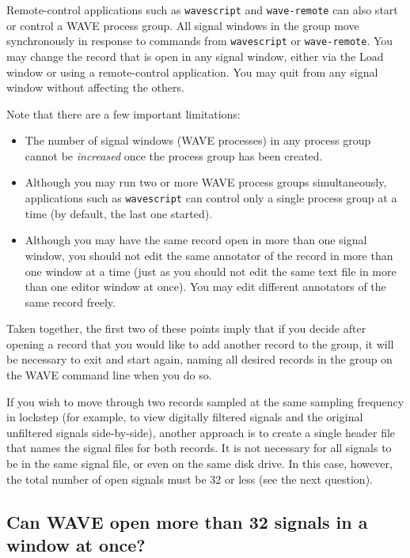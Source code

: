 \documentclass[twoside]{book}
\newcommand{\WAVE}{{\sf WAVE}\xspace}
\begin{document}
Remote-control applications such as {\tt wavescript} and {\tt wave-remote} can
also start or control a \WAVE{} process group.  All signal windows in the
group move synchronously in response to commands from {\tt wavescript} or
{\tt wave-remote}.  You may change the record that is open in any signal
window, either via the {\sf Load} window or using a remote-control application.
You may quit from any signal window without affecting the others.

Note that there are a few important limitations:
\begin{itemize}
\item
The number of signal windows (\WAVE{} processes) in any process group cannot
be \emph{increased} once the process group has been created.  

\item
Although you may run two or more \WAVE{} process groups simultaneously,
applications such as {\tt wavescript} can control only a single process group
at a time (by default, the last one started).

\item
Although you may have the same record open in more than one signal window, you
should not edit the same annotator of the record in more than one window at a
time (just as you should not edit the same text file in more than one editor
window at once).  You may edit different annotators of the same record
freely.
\end{itemize}

Taken together, the first two of these points imply that if you decide after
opening a record that you would like to add another record to the group, it
will be necessary to exit and start again, naming all desired records in the
group on the \WAVE{} command line when you do so.

If you wish to move through two records sampled at the same sampling
frequency in lockstep (for example, to view digitally filtered signals
and the original unfiltered signals side-by-side), another approach is
to create a single header file that names the signal files for both
records.  It is not necessary for all signals to be in the same signal
file, or even on the same disk drive.  In this case, however, the total
number of open signals must be 32 or less (see the next question).

\subsection{Can \WAVE{} open more than 32 signals in a window at once?}
\end{document}
